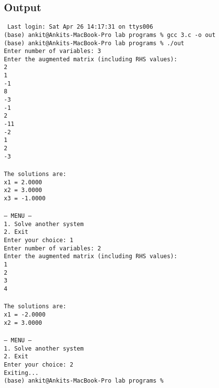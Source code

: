 \documentclass[12pt,a4paper]{article}
\begin{document}
\newpage
\subsection*{Output}
\begin{tcolorbox}[terminalstyle, title=Sample Output]
\texttt{
Last login: Sat Apr 26 14:17:31 on ttys006\\
(base) ankit@Ankits-MacBook-Pro lab programs \% gcc 3.c -o out\\
(base) ankit@Ankits-MacBook-Pro lab programs \% ./out\\
Enter number of variables: 3\\
Enter the augmented matrix (including RHS values):\\
2\\
1\\
-1\\
8\\
-3\\
-1\\
2\\
-11\\
-2\\
1\\
2\\
-3\\
\\
The solutions are:\\
x1 = 2.0000\\
x2 = 3.0000\\
x3 = -1.0000\\
\\
--- MENU ---\\
1. Solve another system\\
2. Exit\\
Enter your choice: 1\\
Enter number of variables: 2\\
Enter the augmented matrix (including RHS values):\\
1\\
2\\
3\\
4\\
\\
The solutions are:\\
x1 = -2.0000\\
x2 = 3.0000\\
\\
--- MENU ---\\
1. Solve another system\\
2. Exit\\
Enter your choice: 2\\
Exiting...\\
(base) ankit@Ankits-MacBook-Pro lab programs \%
}
\end{tcolorbox}
\end{document}
